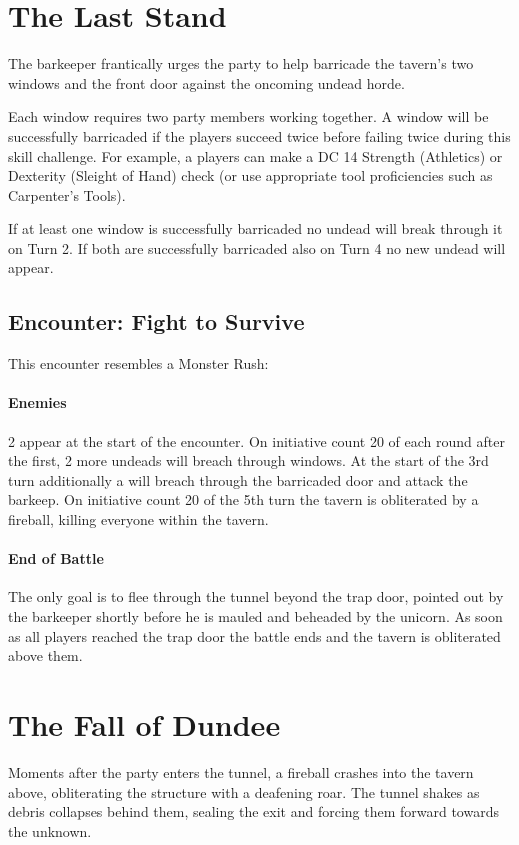 \section*{The Last Stand}
{\entryfont The barkeeper frantically urges the party to help barricade the tavern's two windows and the front door against the oncoming undead horde.

Each window requires two party members working together. A window will be successfully barricaded if the players succeed twice before failing twice during this skill challenge. For example, a players can make a DC 14 Strength (Athletics) or Dexterity (Sleight of Hand) check (or use appropriate tool proficiencies such as Carpenter's Tools).

If at least one window is successfully barricaded no undead will break through it on Turn 2. If both are successfully barricaded also on Turn 4 no new undead will appear.}
\subsection*{Encounter: Fight to Survive}
{\entryfont This encounter resembles a Monster Rush:
\paragraph*{Enemies} 2 \hyperref[monster:UndeadSoldier]{} appear at the start of the encounter. On initiative count 20 of each round after the first, 2 more undeads will breach through windows. At the start of the 3rd turn additionally a \hyperref[monster:CorruptedUnicorn]{} will breach through the barricaded door and attack the barkeep. On initiative count 20 of the 5th turn the tavern is obliterated by a fireball, killing everyone within the tavern.
\paragraph*{End of Battle} The only goal is to flee through the tunnel beyond the trap door, pointed out by the barkeeper shortly before he is mauled and beheaded by the unicorn. As soon as all players reached the trap door the battle ends and the tavern is obliterated above them.}

\section*{The Fall of Dundee}
{\entryfont Moments after the party enters the tunnel, a fireball crashes into the tavern above, obliterating the structure with a deafening roar. The tunnel shakes as debris collapses behind them, sealing the exit and forcing them forward towards the unknown.}

